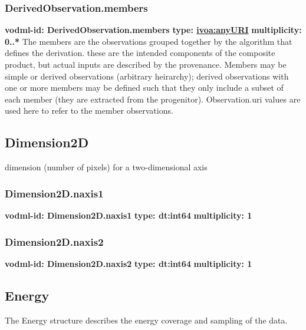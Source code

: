     \subsubsection{DerivedObservation.members}
      \textbf{vodml-id: DerivedObservation.members} \newline
      \textbf{type: \hyperref[sect:ivoa]{ivoa:anyURI}} \newline
      \textbf{multiplicity: 0..*} \newline
      The members are the observations grouped together by the algorithm that defines the derivation. these are the intended components of the composite product, but actual inputs are described by the provenance. Members may be simple or derived observations (arbitrary heirarchy); derived observations with one or more members may be defined such that they only include a subset of each member (they are extracted from the progenitor). Observation.uri values are used here to refer to the member observations.

  \subsection{Dimension2D}
  \label{sect:Dimension2D}
    dimension (number of pixels) for a two-dimensional axis

    \subsubsection{Dimension2D.naxis1}
      \textbf{vodml-id: Dimension2D.naxis1} \newline
      \textbf{type: dt:int64} \newline
      \textbf{multiplicity: 1} 

    \subsubsection{Dimension2D.naxis2}
      \textbf{vodml-id: Dimension2D.naxis2} \newline
      \textbf{type: dt:int64} \newline
      \textbf{multiplicity: 1} 

  \subsection{Energy}
  \label{sect:Energy}
    The Energy structure describes the energy coverage and sampling of the data.

